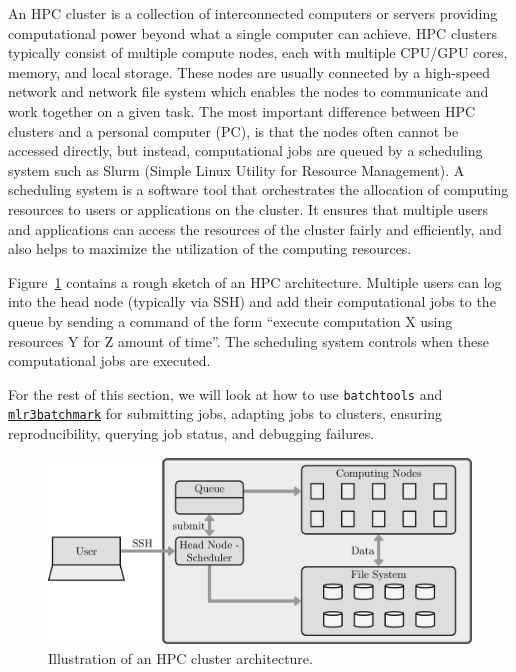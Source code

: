 An HPC cluster is a collection of interconnected computers or servers
providing computational power beyond what a single computer can achieve.
HPC clusters typically consist of multiple compute nodes, each with
multiple CPU/GPU cores, memory, and local storage. These nodes are
usually connected by a high-speed network and network file system which
enables the nodes to communicate and work together on a given task. The
most important difference between HPC clusters and a personal computer
(PC), is that the nodes often cannot be accessed directly, but instead,
computational jobs are queued by a scheduling
system such as Slurm (Simple Linux Utility for
Resource Management). A scheduling system is a software tool that
orchestrates the allocation of computing resources to users or
applications on the cluster. It ensures that multiple users and
applications can access the resources of the cluster fairly and
efficiently, and also helps to maximize the utilization of the computing
resources.

Figure~\ref{fig-hpc} contains a rough sketch of an HPC architecture.
Multiple users can log into the head node (typically via SSH) and add
their computational jobs to the queue by
sending a command of the form ``execute computation X using resources Y
for Z amount of time''. The scheduling system controls when these
computational jobs are executed.

For the rest of this section, we will look at how to use
\texttt{batchtools} and
\href{https://mlr3batchmark.mlr-org.com}{\texttt{mlr3batchmark}}
for submitting jobs, adapting jobs to clusters, ensuring
reproducibility, querying job status, and debugging failures.

\begin{figure}

{\centering \includegraphics[width=1\textwidth,height=\textheight]{chapters/chapter11/Figures/mlr3book_figures-32.png}

}

\caption{\label{fig-hpc}Illustration of an HPC cluster architecture.}

\end{figure}


